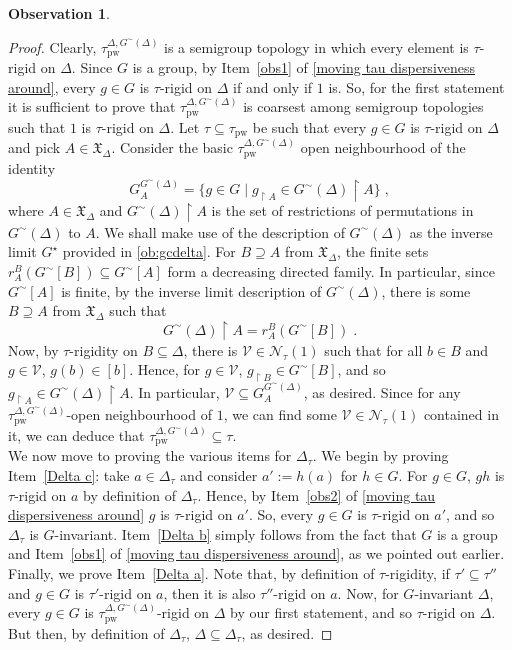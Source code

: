 \documentclass{article}
\theoremstyle{remark}
\theoremstyle{definition}
\newtheorem{observation}[theorem]{Observation}
\newcommand{\V}[0]{\mathcal{V}}
\newcommand{\pw}[0]{\tau_{\mathrm{pw}}}
\newcommand{\X}[0]{\mathfrak{X}}
\newcommand{\gc}[0]{G^{\sim}}
\begin{document}
{{{{{\begin{observation}
\begin{enumerate}[label=(\roman*)]
      
    \end{enumerate}
   \end{observation}
   
  \begin{proof}  
  	Clearly, $\pw^{\Delta, {\gc(\Delta)}}$ is a {semigroup}
    topology in which every element is $\tau$-rigid on $\Delta$.
  	Since $G$ is a group, {by Item~\eqref{obs1} of \cref{moving tau dispersiveness around}, every $g\in G$ is $\tau$-rigid on $\Delta$ if and only if $1$ is. So,} for the first statement it is sufficient to prove that $\pw^{\Delta, {\gc(\Delta)}}$ is coarsest among semigroup topologies such that $1$ is $\tau$-rigid on $\Delta$. Let $\tau\subseteq\pw$ be such that {every $g\in G$}
    is $\tau$-{rigid}
    on $\Delta$ and pick $A\in\X_\Delta$. Consider the basic $\pw^{\Delta,{\gc(\Delta)}}$ open neighbourhood of the identity 
    \[{G_A^{\gc(\Delta)}=\{g\in G\;\vert \; g_{\upharpoonright A}\in \gc(\Delta)\upharpoonright A\}\;,}\]
    {where $A\in\X_\Delta$ and $\gc(\Delta)\upharpoonright A$ is the set of restrictions of permutations in $\gc(\Delta)$ to $A$. We shall make use of the description of $\gc(\Delta)$ as the inverse limit $G^\star$ provided in \cref{ob:gcdelta}. For $B\supseteq A$ from $\X_\Delta$, the finite sets $r_A^B(\gc[B])\subseteq\gc[A]$ form a decreasing directed family. In particular, since $\gc[A]$ is finite, by the inverse limit description of $\gc(\Delta)$, there is some $B\supseteq A$ from $\X_\Delta$ such that} 
    \[\gc(\Delta)\upharpoonright A=r_A^B(\gc[B])\;.\]
   {Now, by $\tau$-rigidity on $B\subseteq\Delta$, there is $\V\in\mathcal{N}_\tau(1)$ such that for all $b\in B$ and $g\in\V$, $g(b)\in[b]$. Hence,  for $g\in \V$, $g_{\upharpoonright B}\in\gc[B]$, and so $g_{\upharpoonright A}\in\gc(\Delta)\upharpoonright A$. In particular, $\V\subseteq G_A^{\gc(\Delta)}$, as desired. Since for any $\pw^{\Delta, \gc(\Delta)}$-open neighbourhood of $1$, we can find some $\V\in\mathcal{N}_\tau(1)$ contained in it, we can deduce that $\pw^{\Delta, \gc(\Delta)}\subseteq\tau$.}\\
    

  {We now move to proving the various items for $\Delta_\tau$. We begin by proving Item~\ref{Delta c}: take $a\in\Delta_\tau$ and consider $a':=h(a)$ for $h\in G$. For $g\in G$, $g h$ is $\tau$-rigid on $a$ by definition of $\Delta_\tau$. Hence, by Item~\eqref{obs2} of \cref{moving tau dispersiveness around} $g$ is $\tau$-rigid on $a'$. So, every $g\in G$ is $\tau$-rigid on $a'$, and so $\Delta_\tau$ is $G$-invariant. Item~\ref{Delta b} simply follows from the fact that $G$ is a group and Item~\eqref{obs1} of \cref{moving tau dispersiveness around}, as we pointed out earlier. Finally, we prove Item~\ref{Delta a}. Note that, by definition of $\tau$-rigidity, if $\tau'\subseteq \tau''$ and $g\in G$ is $\tau'$-rigid on $a$, then it is also $\tau''$-rigid on $a$. Now, for $G$-invariant $\Delta$, every $g\in G$ is $\pw^{\Delta, \gc(\Delta)}$-rigid on $\Delta$ by our first statement, and so $\tau$-rigid on $\Delta$. But then, by definition of $\Delta_\tau$,  $\Delta\subseteq\Delta_\tau$, as desired.} 
  \end{proof}

}}}}}
\end{document}
